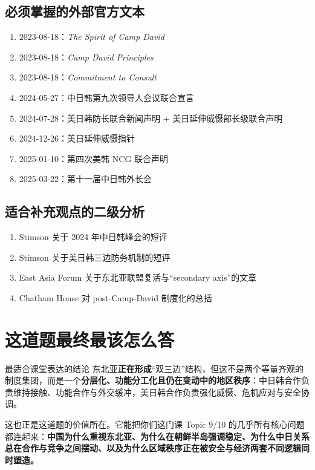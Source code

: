 \documentclass[a4paper]{article}
\begin{document}
\subsection{必须掌握的外部官方文本}

\begin{enumerate}
\item 2023-08-18：\textit{The Spirit of Camp David}
\item 2023-08-18：\textit{Camp David Principles}
\item 2023-08-18：\textit{Commitment to Consult}
\item 2024-05-27：中日韩第九次领导人会议联合宣言
\item 2024-07-28：美日韩防长联合新闻声明 + 美日延伸威慑部长级联合声明
\item 2024-12-26：美日延伸威慑指针
\item 2025-01-10：第四次美韩 NCG 联合声明
\item 2025-03-22：第十一届中日韩外长会
\end{enumerate}

\subsection{适合补充观点的二级分析}

\begin{enumerate}
\item Stimson 关于 2024 年中日韩峰会的短评
\item Stimson 关于美日韩三边防务机制的短评
\item East Asia Forum 关于东北亚联盟复活与“secondary axis”的文章
\item Chatham House 对 post-Camp-David 制度化的总括
\end{enumerate}

\section{这道题最终最该怎么答}

\begin{findingbox}{最适合课堂表达的结论}
东北亚\textbf{正在形成}“双三边”结构，但这不是两个等量齐观的制度集团，而是一个\textbf{分层化、功能分工化且仍在变动中的地区秩序}：中日韩合作负责维持接触、功能合作与外交缓冲，美日韩合作负责强化威慑、危机应对与安全协调。
\end{findingbox}

这也正是这道题的价值所在。它能把你们这门课 Topic 9/10 的几乎所有核心问题都连起来：\textbf{中国为什么重视东北亚、为什么在朝鲜半岛强调稳定、为什么中日关系总在合作与竞争之间摆动、以及为什么区域秩序正在被安全与经济两套不同逻辑同时塑造。}
\end{document}
